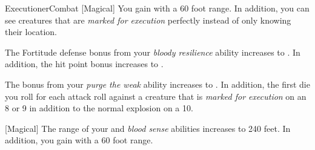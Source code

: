 \begin{feat}{Executioner}{Combat}
        [Magical] You gain  with a 60 foot range.
        In addition, you can see creatures that are \textit{marked for execution} perfectly instead of only knowing their location.

         The Fortitude defense bonus from your \textit{bloody resilience} ability increases to .
        In addition, the hit point bonus increases to .

         The bonus from your \textit{purge the weak} ability increases to .
        In addition, the first die you roll for each attack roll against a creature that is \textit{marked for execution}  on an 8 or 9 in addition to the normal explosion on a 10.

        [Magical] The range of your  and \textit{blood sense} abilities increases to 240 feet.
        In addition, you gain  with a 60 foot range.
    \end{feat}

